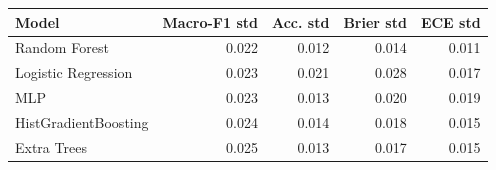 \begin{tabular}{lrrrr}
\hline
Model & Macro-F1 std & Acc. std & Brier std & ECE std \\
\hline
Random Forest & 0.022 & 0.012 & 0.014 & 0.011 \\
Logistic Regression & 0.023 & 0.021 & 0.028 & 0.017 \\
MLP & 0.023 & 0.013 & 0.020 & 0.019 \\
HistGradientBoosting & 0.024 & 0.014 & 0.018 & 0.015 \\
Extra Trees & 0.025 & 0.013 & 0.017 & 0.015 \\
\hline
\end{tabular}
